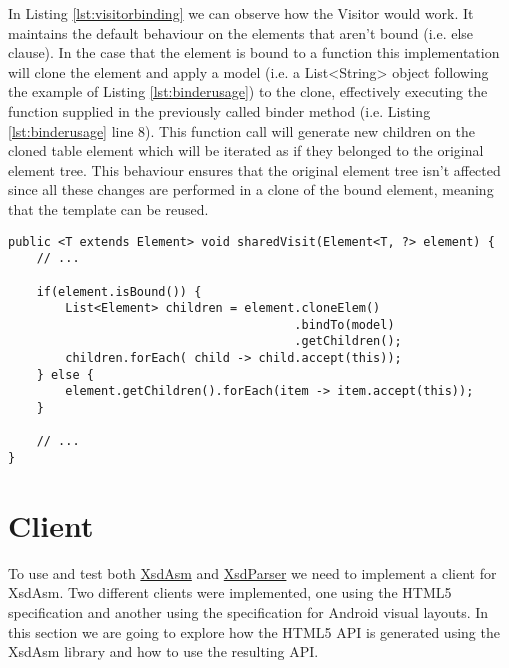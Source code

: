 \noindent
In Listing \ref{lst:visitorbinding} we can observe how the Visitor would work. It maintains the default behaviour on the elements that aren't bound (i.e. else clause). In the case that the element is bound to a function this implementation will clone the element and apply a model (i.e. a List<String> object following the example of Listing \ref{lst:binderusage}) to the clone, effectively executing the function supplied in the previously called binder method (i.e. Listing \ref{lst:binderusage} line 8). This function call will generate new children on the cloned table element which will be iterated as if they belonged to the original element tree. This behaviour ensures that the original element tree isn't affected since all these changes are performed in a clone of the bound element, meaning that the template can be reused.

\bigskip


\begin{minipage}{\linewidth}
\begin{lstlisting}[caption={Visitor with binding support},label={lst:visitorbinding}]
public <T extends Element> void sharedVisit(Element<T, ?> element) {
    // ...
    
    if(element.isBound()) {
        List<Element> children = element.cloneElem()
                                        .bindTo(model)
                                        .getChildren();
        children.forEach( child -> child.accept(this));
    } else {
        element.getChildren().forEach(item -> item.accept(this));
    }
    
    // ...
}
\end{lstlisting}
\end{minipage}
        
\newpage

\section{Client} %
\label{sec:client}

To use and test both \hyperref[sec:xsdasm]{XsdAsm} and \hyperref[sec:xsdparser]{XsdParser} we need to implement a client for XsdAsm. Two different clients were implemented, one using the \ac{HTML}5 specification and another using the specification for Android visual layouts. In this section we are going to explore how the \ac{HTML}5 \ac{API} is generated using the XsdAsm library and how to use the resulting \ac{API}.

